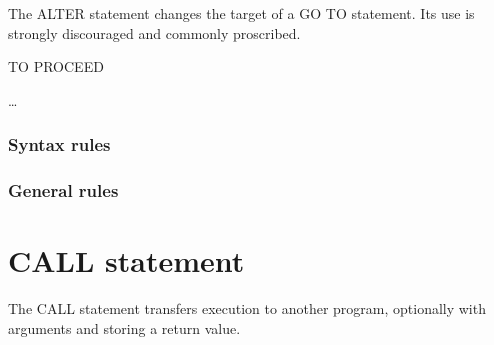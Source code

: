 The ALTER statement changes the target of a GO TO statement. Its use is strongly discouraged and commonly proscribed.

\begin{syntax}[\deletedcolour]
    \begin{1=}
      \procedurename TO PROCEED  \procedurename
    \end{1=} \ldots
\end{syntax}

\subsubsection{Syntax rules}

\subsubsection{General rules}

\section{CALL statement}

The CALL statement transfers execution to another program, optionally with arguments and storing a return value.

